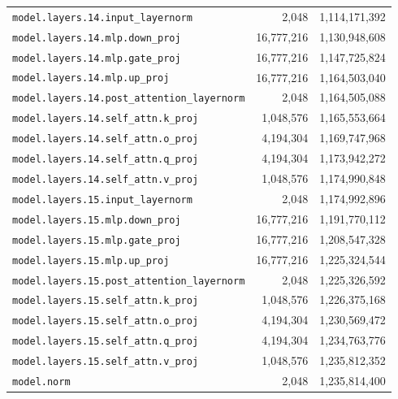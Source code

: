 \documentclass[10pt,a4paper]{article}
\theoremstyle{definition}
\begin{document}
\begin{appendices}
\begin{longtable}{p{9.5cm}rr}
\texttt{model.\allowbreak{}layers.\allowbreak{}14.\allowbreak{}input\_layernorm} & 2,048 & 1,114,171,392 \\
\texttt{model.\allowbreak{}layers.\allowbreak{}14.\allowbreak{}mlp.\allowbreak{}down\_proj} & 16,777,216 & 1,130,948,608 \\
\texttt{model.\allowbreak{}layers.\allowbreak{}14.\allowbreak{}mlp.\allowbreak{}gate\_proj} & 16,777,216 & 1,147,725,824 \\
\texttt{model.\allowbreak{}layers.\allowbreak{}14.\allowbreak{}mlp.\allowbreak{}up\_proj} & 16,777,216 & 1,164,503,040 \\
\texttt{model.\allowbreak{}layers.\allowbreak{}14.\allowbreak{}post\_attention\_layernorm} & 2,048 & 1,164,505,088 \\
\texttt{model.\allowbreak{}layers.\allowbreak{}14.\allowbreak{}self\_attn.\allowbreak{}k\_proj} & 1,048,576 & 1,165,553,664 \\
\texttt{model.\allowbreak{}layers.\allowbreak{}14.\allowbreak{}self\_attn.\allowbreak{}o\_proj} & 4,194,304 & 1,169,747,968 \\
\texttt{model.\allowbreak{}layers.\allowbreak{}14.\allowbreak{}self\_attn.\allowbreak{}q\_proj} & 4,194,304 & 1,173,942,272 \\
\texttt{model.\allowbreak{}layers.\allowbreak{}14.\allowbreak{}self\_attn.\allowbreak{}v\_proj} & 1,048,576 & 1,174,990,848 \\
\texttt{model.\allowbreak{}layers.\allowbreak{}15.\allowbreak{}input\_layernorm} & 2,048 & 1,174,992,896 \\
\texttt{model.\allowbreak{}layers.\allowbreak{}15.\allowbreak{}mlp.\allowbreak{}down\_proj} & 16,777,216 & 1,191,770,112 \\
\texttt{model.\allowbreak{}layers.\allowbreak{}15.\allowbreak{}mlp.\allowbreak{}gate\_proj} & 16,777,216 & 1,208,547,328 \\
\texttt{model.\allowbreak{}layers.\allowbreak{}15.\allowbreak{}mlp.\allowbreak{}up\_proj} & 16,777,216 & 1,225,324,544 \\
\texttt{model.\allowbreak{}layers.\allowbreak{}15.\allowbreak{}post\_attention\_layernorm} & 2,048 & 1,225,326,592 \\
\texttt{model.\allowbreak{}layers.\allowbreak{}15.\allowbreak{}self\_attn.\allowbreak{}k\_proj} & 1,048,576 & 1,226,375,168 \\
\texttt{model.\allowbreak{}layers.\allowbreak{}15.\allowbreak{}self\_attn.\allowbreak{}o\_proj} & 4,194,304 & 1,230,569,472 \\
\texttt{model.\allowbreak{}layers.\allowbreak{}15.\allowbreak{}self\_attn.\allowbreak{}q\_proj} & 4,194,304 & 1,234,763,776 \\
\texttt{model.\allowbreak{}layers.\allowbreak{}15.\allowbreak{}self\_attn.\allowbreak{}v\_proj} & 1,048,576 & 1,235,812,352 \\
\texttt{model.\allowbreak{}norm} & 2,048 & 1,235,814,400 \\
\end{longtable}
\end{appendices}
\end{document}
